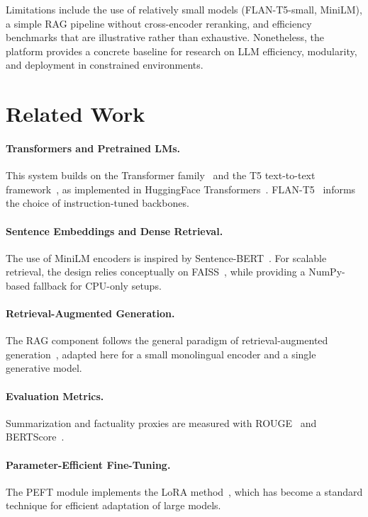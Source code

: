\documentclass[11pt]{article}
\begin{document}
Limitations include the use of relatively small models (FLAN-T5-small, MiniLM), a simple RAG pipeline without cross-encoder reranking, and efficiency benchmarks that are illustrative rather than exhaustive. Nonetheless, the platform provides a concrete baseline for research on LLM efficiency, modularity, and deployment in constrained environments.

\section{Related Work}

\paragraph{Transformers and Pretrained LMs.}
This system builds on the Transformer family~\citep{vaswani2017attention} and the T5 text-to-text framework~\citep{raffel2020t5}, as implemented in HuggingFace Transformers~\citep{wolf2020transformers}. FLAN-T5~\citep{chung2022scaling} informs the choice of instruction-tuned backbones.

\paragraph{Sentence Embeddings and Dense Retrieval.}
The use of MiniLM encoders is inspired by Sentence-BERT~\citep{reimers2019sentencebert}. For scalable retrieval, the design relies conceptually on FAISS~\citep{johnson2019faiss}, while providing a NumPy-based fallback for CPU-only setups.

\paragraph{Retrieval-Augmented Generation.}
The RAG component follows the general paradigm of retrieval-augmented generation~\citep{lewis2020rag}, adapted here for a small monolingual encoder and a single generative model.

\paragraph{Evaluation Metrics.}
Summarization and factuality proxies are measured with ROUGE~\citep{lin2004rouge} and BERTScore~\citep{zhang2020bertscore}.

\paragraph{Parameter-Efficient Fine-Tuning.}
The PEFT module implements the LoRA method~\citep{hu2022lora}, which has become a standard technique for efficient adaptation of large models.
\end{document}

